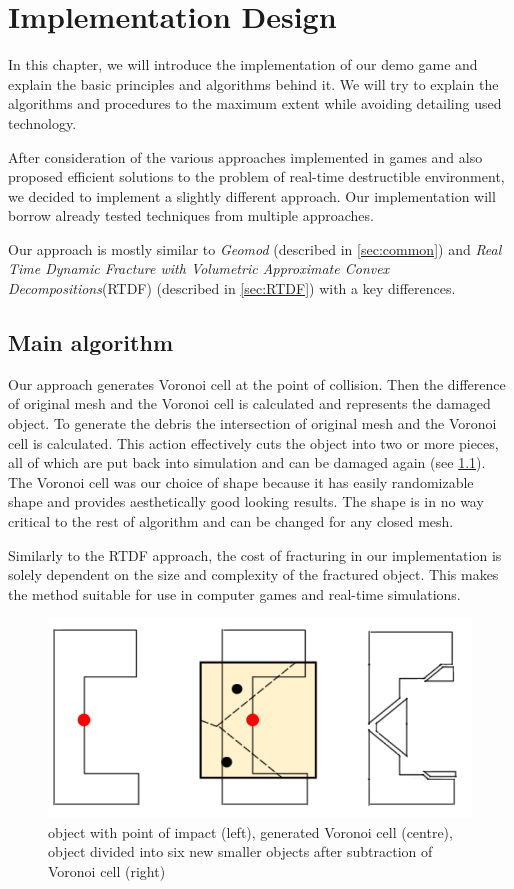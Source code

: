 \chapter{Implementation Design}
In this chapter, we will introduce the implementation of our demo game and explain the basic principles and algorithms behind it. We will try to explain the algorithms and procedures to the maximum extent while avoiding detailing used technology.

After consideration of the various approaches implemented in games and also proposed efficient solutions to the problem of real-time destructible environment, we decided to implement a slightly different approach. Our implementation will borrow already tested techniques from multiple approaches.

Our approach is mostly similar to \emph{Geomod} (described in \cref{sec:common}) and \emph{Real Time Dynamic Fracture
with Volumetric Approximate Convex Decompositions}(RTDF) (described in \cref{sec:RTDF}) with a key differences. 

\section{Main algorithm}
Our approach generates Voronoi cell at the point of collision. Then the difference of original mesh and the Voronoi cell is calculated and represents the damaged object. To generate the debris the intersection of original mesh and the Voronoi cell is calculated. This action effectively cuts the object into two or more pieces, all of which are put back into simulation and can be damaged again (see \cref{fig:subtraction}). The Voronoi cell was our choice of shape because it has easily randomizable shape and provides aesthetically good looking results. The shape is in no way critical to the rest of algorithm and can be changed for any closed mesh.

Similarly to the RTDF approach, the cost of fracturing in our implementation is solely dependent on the size and complexity of the fractured object.  This makes the method suitable for use in computer games and real-time simulations.

\begin{figure}
        \centering
        \includegraphics[width=\textwidth]{img/subtractionProcess}
        \caption{object with point of impact (left), generated Voronoi cell (centre), object divided into six new smaller objects after subtraction of Voronoi cell (right)}
        \label{fig:subtraction}
\end{figure}


